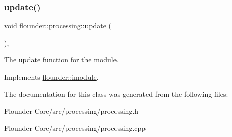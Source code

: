 \subsubsection{\texorpdfstring{update()}{update()}}
{\footnotesize\ttfamily void flounder\+::processing\+::update (\begin{DoxyParamCaption}{ }\end{DoxyParamCaption})\hspace{0.3cm}{\ttfamily [override]}, {\ttfamily [virtual]}}



The update function for the module. 



Implements \hyperlink{classflounder_1_1imodule_a9a53d48a46b5f6b16a92b2cd8503f74a}{flounder\+::imodule}.



The documentation for this class was generated from the following files\+:\begin{DoxyCompactItemize}
\item 
Flounder-\/\+Core/src/processing/processing.\+h\item 
Flounder-\/\+Core/src/processing/processing.\+cpp\end{DoxyCompactItemize}
